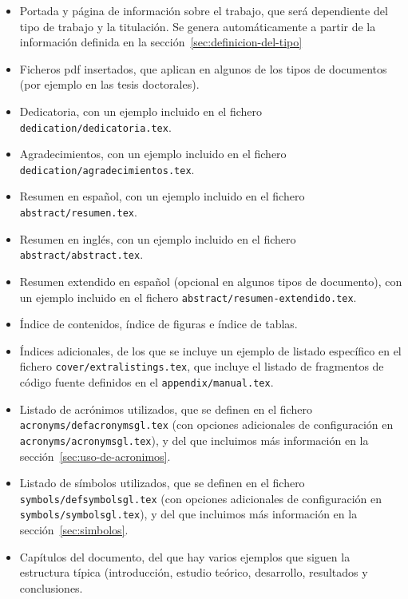 \documentclass[spanish,openright]{book}
\begin{document}
\begin{itemize}

\item Portada y página de información sobre el trabajo, que será
dependiente del tipo de trabajo y la titulación. Se genera
automáticamente a partir de la información definida en la
sección~\ref{sec:definicion-del-tipo}

\item Ficheros pdf insertados, que aplican en algunos de los tipos de
documentos (por ejemplo en las tesis doctorales).

\item Dedicatoria, con un ejemplo incluido en el fichero
\texttt{dedication/dedicatoria.tex}.
\item Agradecimientos, con un ejemplo incluido en el fichero
\texttt{dedication/agradecimientos.tex}.


\item Resumen en español, con un ejemplo incluido en el fichero
\texttt{abstract/resumen.tex}.
\item Resumen en inglés, con un ejemplo incluido en el fichero
\texttt{abstract/abstract.tex}.
\item Resumen extendido en español (opcional en algunos tipos de
documento), con un ejemplo incluido en el fichero
\texttt{abstract/resumen-extendido.tex}.

\item Índice de contenidos, índice de figuras e índice de tablas.
\item Índices adicionales, de los que se incluye un ejemplo de listado
específico en el fichero \texttt{cover/extralistings.tex}, que incluye
el listado de fragmentos de código fuente definidos en el
\texttt{appendix/manual.tex}.

\item Listado de acrónimos utilizados, que se definen en el fichero
\texttt{acronyms/defacronymsgl.tex} (con opciones adicionales de
configuración en \texttt{acronyms/acronymsgl.tex}), y del que
incluimos más información en la sección~\ref{sec:uso-de-acronimos}.
\item Listado de símbolos utilizados, que se definen en el fichero
\texttt{symbols/defsymbolsgl.tex} (con opciones adicionales de
configuración en \texttt{symbols/symbolsgl.tex}), y del que incluimos
más información en la sección~\ref{sec:simbolos}.


\item Capítulos del documento, del que hay varios ejemplos que siguen la
estructura típica (introducción, estudio teórico, desarrollo,
resultados y conclusiones.


\end{itemize}
\end{document}

